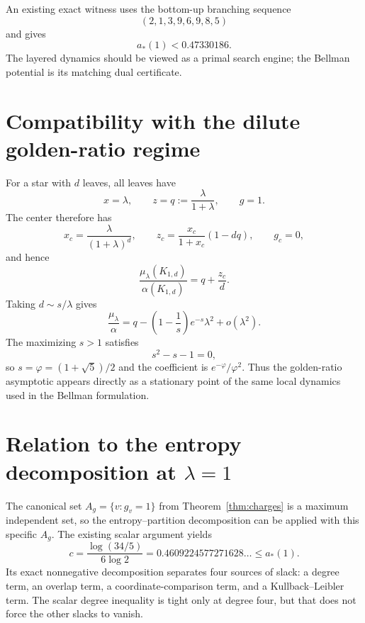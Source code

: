 \documentclass[11pt,a4paper]{article}
\theoremstyle{definition}
\theoremstyle{remark}
\newcommand{\1}{\mathbf 1}
\begin{document}
An existing exact witness uses the bottom-up branching sequence
\begin{equation}
  (2,1,3,9,6,9,8,5)
  \label{eq:known-sequence}
\end{equation}
and gives
\begin{equation}
  a_*(1)<0.47330186.
  \label{eq:known-upper}
\end{equation}
The layered dynamics should be viewed as a primal search engine; the Bellman potential is its
matching dual certificate.

\section{Compatibility with the dilute golden-ratio regime}

For a star with $d$ leaves, all leaves have
\[
  x=\lambda,
  \qquad
  z=q:=\frac{\lambda}{1+\lambda},
  \qquad
  g=1.
\]
The center therefore has
\[
  x_c=\frac{\lambda}{(1+\lambda)^d},
  \qquad
  z_c=\frac{x_c}{1+x_c}(1-dq),
  \qquad
  g_c=0,
\]
and hence
\begin{equation}
  \frac{\mu_\lambda(K_{1,d})}{\alpha(K_{1,d})}
  =q+\frac{z_c}{d}.
  \label{eq:star-exact}
\end{equation}
Taking $d\sim s/\lambda$ gives
\[
  \frac{\mu_\lambda}{\alpha}
  =q-\left(1-\frac1s\right)e^{-s}\lambda^2+o(\lambda^2).
\]
The maximizing $s>1$ satisfies
\[
  s^2-s-1=0,
\]
so $s=\varphi=(1+\sqrt5)/2$ and the coefficient is
$e^{-\varphi}/\varphi^2$.  Thus the golden-ratio asymptotic appears directly as a stationary
point of the same local dynamics used in the Bellman formulation.

\section{Relation to the entropy decomposition at $\lambda=1$}

The canonical set $A_g=\{v:g_v=1\}$ from Theorem~\ref{thm:charges} is a maximum independent
set, so the entropy--partition decomposition can be applied with this specific $A_g$.
The existing scalar argument yields
\begin{equation}
  c
  =\frac{\log(34/5)}{6\log2}
  =0.4609224577271628\ldots
  \le a_*(1).
  \label{eq:entropy-lb}
\end{equation}
Its exact nonnegative decomposition separates four sources of slack: a degree term, an overlap
term, a coordinate-comparison term, and a Kullback--Leibler term.  The scalar degree inequality
is tight only at degree four, but that does not force the other slacks to vanish.
\end{document}
